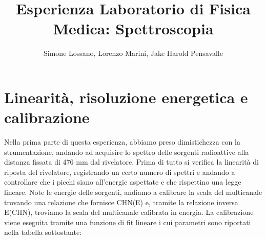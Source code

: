 \documentclass[a4paper]{article}
\title{Esperienza Laboratorio di Fisica Medica: Spettroscopia}
\author{Simone Lossano, Lorenzo Marini, Jake Harold Pensavalle}
\begin{document}
	\maketitle
	\newpage
	\tableofcontents
	\newpage
\section{Linearità, risoluzione energetica e calibrazione}
Nella prima parte di questa esperienza, abbiamo preso dimistichezza con la strumentazione, andando ad acquisire lo spettro delle sorgenti radioattive alla distanza fissata di 476 mm dal rivelatore.
Prima di tutto si verifica la linearità di riposta del rivelatore, registrando un certo numero di spettri e andando a controllare che i picchi siano all'energie aspettate e che rispettino una legge lineare. 
Note le energie delle sorgenti, andiamo a calibrare la scala del multicanale trovando una relazione che fornisce CHN(E) e, tramite la relazione inversa E(CHN), troviamo la scala del multicanale calibrata in energia. La calibrazione viene eseguita tramite una funzione di fit lineare i cui parametri sono riportati nella tabella sottostante:
\end{document}
